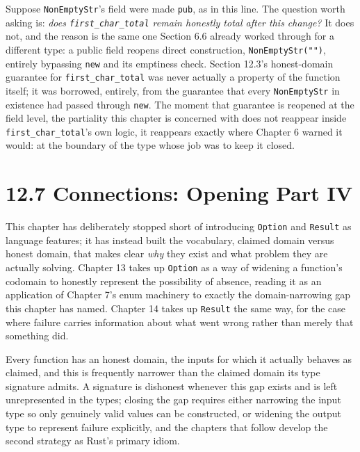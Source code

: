 \documentclass[11pt]{book}
\begin{document}
Suppose \texttt{NonEmptyStr}'s field were made \texttt{pub}, as in this line. The question worth asking is: \emph{does \texttt{first\_char\_total} remain honestly total after this change?} It does not, and the reason is the same one Section 6.6 already worked through for a different type: a public field reopens direct construction, \texttt{NonEmptyStr("")}, entirely bypassing \texttt{new} and its emptiness check. Section 12.3's honest-domain guarantee for \texttt{first\_char\_total} was never actually a property of the function itself; it was borrowed, entirely, from the guarantee that every \texttt{NonEmptyStr} in existence had passed through \texttt{new}. The moment that guarantee is reopened at the field level, the partiality this chapter is concerned with does not reappear inside \texttt{first\_char\_total}'s own logic, it reappears exactly where Chapter 6 warned it would: at the boundary of the type whose job was to keep it closed.

\section*{12.7 Connections: Opening Part IV}

This chapter has deliberately stopped short of introducing \texttt{Option} and \texttt{Result} as language features; it has instead built the vocabulary, claimed domain versus honest domain, that makes clear \emph{why} they exist and what problem they are actually solving. Chapter 13 takes up \texttt{Option} as a way of widening a function's codomain to honestly represent the possibility of absence, reading it as an application of Chapter 7's enum machinery to exactly the domain-narrowing gap this chapter has named. Chapter 14 takes up \texttt{Result} the same way, for the case where failure carries information about what went wrong rather than merely that something did.

\begin{invariantbox}
Every function has an honest domain, the inputs for which it actually behaves as claimed, and this is frequently narrower than the claimed domain its type signature admits. A signature is dishonest whenever this gap exists and is left unrepresented in the types; closing the gap requires either narrowing the input type so only genuinely valid values can be constructed, or widening the output type to represent failure explicitly, and the chapters that follow develop the second strategy as Rust's primary idiom.
\end{invariantbox}
\end{document}
